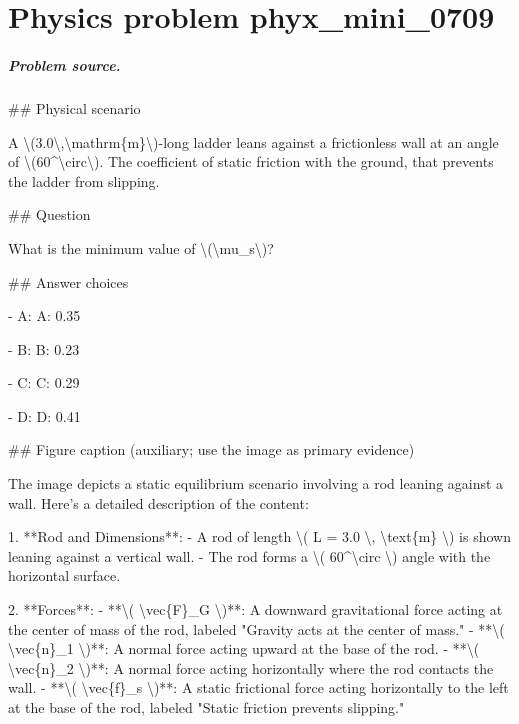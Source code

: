 
\chapter{Physics problem phyx\_mini\_0709}
\label{ch:PhyXMiniProblems_problem_phyx_mini_0709}

\paragraph{Problem source.}
\#\# Physical scenario

A \textbackslash{}(3.0\textbackslash{},\textbackslash{}mathrm\{m\}\textbackslash{})-long ladder leans against a frictionless wall at an angle of \textbackslash{}(60\textasciicircum{}\textbackslash{}circ\textbackslash{}). The coefficient of static friction with the ground, that prevents the ladder from slipping.

\#\# Question

What is the minimum value of \textbackslash{}(\textbackslash{}mu\_s\textbackslash{})?

\#\# Answer choices

- A: A: 0.35

- B: B: 0.23

- C: C: 0.29

- D: D: 0.41

\#\# Figure caption (auxiliary; use the image as primary evidence)

The image depicts a static equilibrium scenario involving a rod leaning against a wall. Here's a detailed description of the content:

1. **Rod and Dimensions**:
   - A rod of length \textbackslash{}( L = 3.0 \textbackslash{}, \textbackslash{}text\{m\} \textbackslash{}) is shown leaning against a vertical wall.
   - The rod forms a \textbackslash{}( 60\textasciicircum{}\textbackslash{}circ \textbackslash{}) angle with the horizontal surface.

2. **Forces**:
   - **\textbackslash{}( \textbackslash{}vec\{F\}\_G \textbackslash{})**: A downward gravitational force acting at the center of mass of the rod, labeled "Gravity acts at the center of mass."
   - **\textbackslash{}( \textbackslash{}vec\{n\}\_1 \textbackslash{})**: A normal force acting upward at the base of the rod.
   - **\textbackslash{}( \textbackslash{}vec\{n\}\_2 \textbackslash{})**: A normal force acting horizontally where the rod contacts the wall.
   - **\textbackslash{}( \textbackslash{}vec\{f\}\_s \textbackslash{})**: A static frictional force acting horizontally to the left at the base of the rod, labeled "Static friction prevents slipping."

